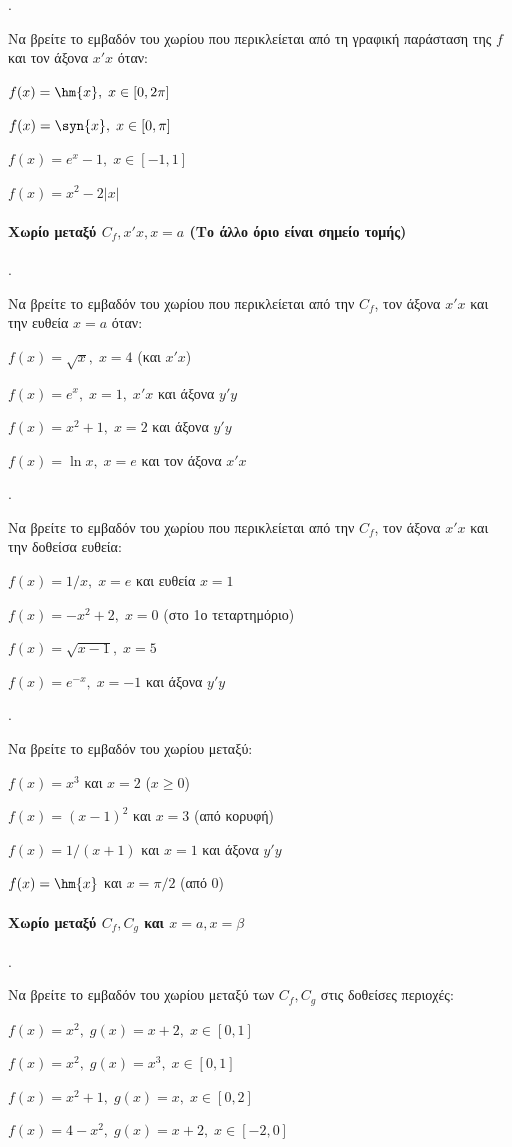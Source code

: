 \documentclass[11pt,a4paper,twocolumn]{article}
\newcounter{askhsh}
\newcommand{\askhsh}{\large\theaskhsh.\ \addtocounter{askhsh}{1}}
\begin{document}
\askhsh Να βρείτε το εμβαδόν του χωρίου που περικλείεται από τη γραφική παράσταση της $f$ και τον άξονα $x'x$ όταν:
\begin{alist}
\item $f(x)=\hm{x}, \; x \in [0, 2\pi]$
\item $f(x)=\syn{x}, \; x \in [0, \pi]$
\item $f(x)=e^x-1, \; x \in [-1, 1]$
\item $f(x)=x^2-2|x|$
\end{alist}

\paragraph{Χωρίο μεταξύ $C_f,x'x,x=a$ (Το άλλο όριο είναι σημείο τομής)}
\askhsh Να βρείτε το εμβαδόν του χωρίου που περικλείεται από την $C_f$, τον άξονα $x'x$ και την ευθεία $x=a$ όταν:
\begin{alist}
\item $f(x)=\sqrt{x}, \; x=4$ (και $x'x$)
\item $f(x)=e^x, \; x=1, \; x'x$ και άξονα $y'y$
\item $f(x)=x^2+1, \; x=2$ και άξονα $y'y$
\item $f(x)=\ln{x}, \; x=e$ και τον άξονα $x'x$
\end{alist}

\askhsh Να βρείτε το εμβαδόν του χωρίου που περικλείεται από την $C_f$, τον άξονα $x'x$ και την δοθείσα ευθεία:
\begin{alist}
\item $f(x)=1/x, \; x=e$ και ευθεία $x=1$
\item $f(x)=-x^2+2, \; x=0$ (στο 1ο τεταρτημόριο)
\item $f(x)=\sqrt{x-1}, \; x=5$
\item $f(x)=e^{-x}, \; x=-1$ και άξονα $y'y$
\end{alist}

\askhsh Να βρείτε το εμβαδόν του χωρίου μεταξύ:
\begin{alist}
\item $f(x)=x^3$ και $x=2$ ($x \ge 0$)
\item $f(x)=(x-1)^2$ και $x=3$ (από κορυφή)
\item $f(x)=1/(x+1)$ και $x=1$ και άξονα $y'y$
\item $f(x)=\hm{x}$ και $x=\pi/2$ (από $0$)
\end{alist}

\paragraph{Χωρίο μεταξύ $C_f,C_g$ και $x=a, x=\beta$}
\askhsh Να βρείτε το εμβαδόν του χωρίου μεταξύ των $C_f, C_g$ στις δοθείσες περιοχές:
\begin{alist}
\item $f(x)=x^2, \; g(x)=x+2, \; x \in [0, 1]$
\item $f(x)=x^2, \; g(x)=x^3, \; x \in [0, 1]$
\item $f(x)=x^2+1, \; g(x)=x, \; x \in [0, 2]$
\item $f(x)=4-x^2, \; g(x)=x+2, \; x \in [-2, 0]$
\end{alist}
\end{document}
